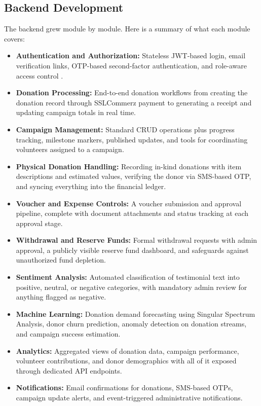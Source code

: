 \documentclass{thesis-library}
\begin{document}
\subsection{Backend Development}
The backend grew module by module. Here is a summary of what each module covers:
\begin{itemize}
    \item \textbf{Authentication and Authorization:} Stateless JWT-based login, email verification links, OTP-based second-factor authentication, and role-aware access control \cite{jones2015jwt}.
    \item \textbf{Donation Processing:} End-to-end donation workflows from creating the donation record through SSLCommerz payment to generating a receipt and updating campaign totals in real time.
    \item \textbf{Campaign Management:} Standard CRUD operations plus progress tracking, milestone markers, published updates, and tools for coordinating volunteers assigned to a campaign.
    \item \textbf{Physical Donation Handling:} Recording in-kind donations with item descriptions and estimated values, verifying the donor via SMS-based OTP, and syncing everything into the financial ledger.
    \item \textbf{Voucher and Expense Controls:} A voucher submission and approval pipeline, complete with document attachments and status tracking at each approval stage.
    \item \textbf{Withdrawal and Reserve Funds:} Formal withdrawal requests with admin approval, a publicly visible reserve fund dashboard, and safeguards against unauthorized fund depletion.
    \item \textbf{Sentiment Analysis:} Automated classification of testimonial text into positive, neutral, or negative categories, with mandatory admin review for anything flagged as negative.
    \item \textbf{Machine Learning:} Donation demand forecasting using Singular Spectrum Analysis, donor churn prediction, anomaly detection on donation streams, and campaign success estimation.
    \item \textbf{Analytics:} Aggregated views of donation data, campaign performance, volunteer contributions, and donor demographics with all of it exposed through dedicated API endpoints.
    \item \textbf{Notifications:} Email confirmations for donations, SMS-based OTPs, campaign update alerts, and event-triggered administrative notifications.
\end{itemize}
\end{document}
